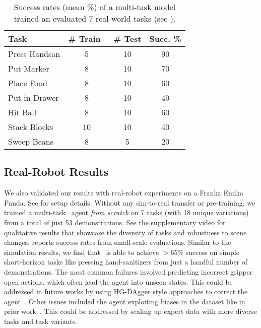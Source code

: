 \begin{wraptable}{r}{0.3\textwidth}
  \vspace{-1.3em}
  \setlength\tabcolsep{2.3pt}
  \centering
  \scriptsize
\begin{tabular}{lccc} 
\toprule
Task          & \# Train~ & \# Test & Succ. \%  \\ 
\midrule
Press Handsan & 5         & 10      & 90        \\
Put Marker    & 8         & 10      & 70        \\
Place Food    & 8         & 10      & 60        \\
Put in Drawer & 8         & 10      & 40        \\
Hit Ball      & 8         & 10      & 60        \\
Stack Blocks  & 10        & 10      & 40        \\
Sweep Beans   & 8         & 5       & 20        \\
\bottomrule
\end{tabular}
    \caption{\scriptsize{Success rates (mean \%) of a multi-task model trained an evaluated 7 real-world tasks (see ).}} %
  \vspace{-2em}
  \label{table:real}
\end{wraptable}\subsection{Real-Robot Results} \label{sec:real_robot_results}
We also validated our results with real-robot experiments on a Franka Emika Panda. See   for setup details. Without any sim-to-real transfer or pre-training, we trained a multi-task \model~agent \textit{from scratch }on 7 tasks (with 18 unique variations) from a total of just 53 demonstrations. See the supplementary video for qualitative results that showcase the diversity of tasks and robustness to scene changes.  reports success rates from small-scale evaluations. Similar to the simulation results, we find that \model~is able to achieve $>65\%$ success on simple short-horizon tasks like pressing hand-sanitizers from just a handful number of demonstrations. The most common failures involved predicting incorrect gripper open actions, which often lead the agent into unseen states. This could be addressed in future works by using HG-DAgger style approaches to correct the agent~\citep{jang2022bc}. Other issues included the agent exploiting biases in the dataset like in prior work~\citep{cliport}. This could be addressed by scaling up expert data with more diverse tasks and task variants.  

